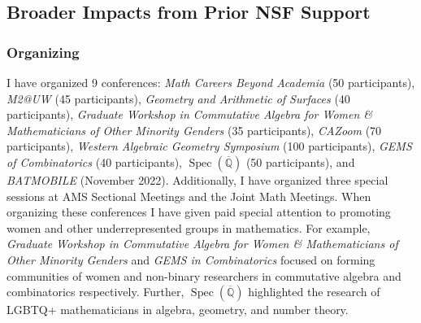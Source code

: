 \documentclass[11pt,reqno]{amsart}
\newtheorem{conj}[lemma]{Conjecture}
\theoremstyle{remark}
\newcommand{\Spec}{\operatorname{Spec}}
\newcommand{\Nef}{\operatorname{Nef}}
\newcommand{\fF}{\mathbf F}
\newcommand{\cD}{\mathcal{D}}
\newcommand{\cL}{\mathcal{L}}
\newcommand{\Q}{\mathbb{Q}}
\newcommand{\V}{\mathbb{V}}
\begin{document}
%
%
%
 
\subsection{Broader Impacts from Prior NSF Support}

\subsubsection{Organizing}\label{subsubsec:prior-organizing} I have organized 9 conferences: \textit{Math Careers Beyond Academia } (50 participants), \textit{M2@UW} (45 participants), \textit{Geometry and Arithmetic of Surfaces} (40 participants), \textit{Graduate Workshop in Commutative Algebra for Women \& Mathematicians of Other Minority Genders} (35 participants), \textit{CAZoom} (70 participants), \textit{Western Algebraic Geometry Symposium} (100 participants), \textit{GEMS of Combinatorics} (40 participants), $\Spec(\overline{\Q})$ (50 participants), and \textit{BATMOBILE} (November 2022). Additionally, I have organized three special sessions at AMS Sectional Meetings and the Joint Math Meetings. When organizing these conferences I have given paid special attention to promoting women and other underrepresented groups in mathematics. For example, \textit{Graduate Workshop in Commutative Algebra for Women \& Mathematicians of Other Minority Genders} and \textit{GEMS in Combinatorics}  focused on forming communities of women and non-binary researchers in commutative algebra and combinatorics respectively. Further, $\Spec(\overline{\Q})$ highlighted the research of LGBTQ+ mathematicians in algebra, geometry, and number theory.
\end{document}
